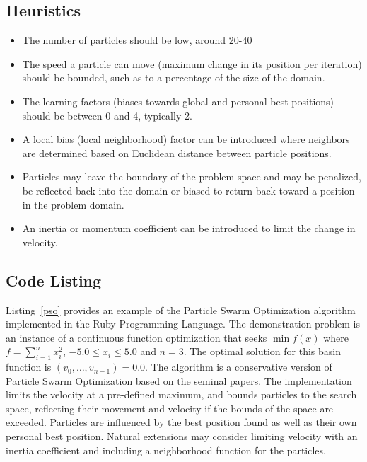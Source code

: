 \subsection{Heuristics}
\begin{itemize}
	\item The number of particles should be low, around 20-40
	\item The speed a particle can move (maximum change in its position per iteration) should be bounded, such as to a percentage of the size of the domain.
	\item The learning factors (biases towards global and personal best positions) should be between 0 and 4, typically 2.
	\item A local bias (local neighborhood) factor can be introduced where neighbors are determined based on Euclidean distance between particle positions.
	\item Particles may leave the boundary of the problem space and may be penalized, be reflected back into the domain or biased to return back toward a position in the problem domain. 
	\item An inertia or momentum coefficient can be introduced to limit the change in velocity.
\end{itemize}

\subsection{Code Listing}
Listing~\ref{pso} provides an example of the Particle Swarm Optimization algorithm implemented in the Ruby Programming Language. 
The demonstration problem is an instance of a continuous function optimization that seeks $\min f(x)$ where $f=\sum_{i=1}^n x_{i}^2$, $-5.0\leq x_i \leq 5.0$ and $n=3$. The optimal solution for this basin function is $(v_0,\ldots,v_{n-1})=0.0$.
The algorithm is a conservative version of Particle Swarm Optimization based on the seminal papers. The implementation limits the velocity at a pre-defined maximum, and bounds particles to the search space, reflecting their movement and velocity if the bounds of the space are exceeded. Particles are influenced by the best position found as well as their own personal best position. Natural extensions may consider limiting velocity with an inertia coefficient and including a neighborhood function for the particles.


